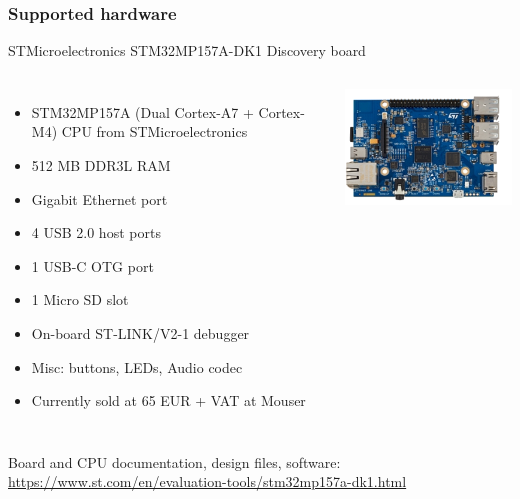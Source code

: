 \begin{frame}
\frametitle{Supported hardware}
  STMicroelectronics STM32MP157A-DK1 Discovery board
  \begin{columns}
    {\footnotesize
    \begin{itemize}
    \item STM32MP157A (Dual Cortex-A7 + Cortex-M4) CPU from STMicroelectronics
    \item 512 MB DDR3L RAM
    \item Gigabit Ethernet port
    \item 4 USB 2.0 host ports
    \item 1 USB-C OTG port
    \item 1 Micro SD slot
    \item On-board ST-LINK/V2-1 debugger
    \item Misc: buttons, LEDs, Audio codec
    \item Currently sold at 65 EUR + VAT at Mouser
    \end{itemize}
    }
    \includegraphics[width=\textwidth]{slides/discovery-board-dk1/discovery-board-dk1.png}
  \end{columns}
  \vspace{1em}
  {\small
  Board and CPU documentation, design files, software:
  \url{https://www.st.com/en/evaluation-tools/stm32mp157a-dk1.html}
  }
\end{frame}
